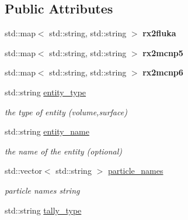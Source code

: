 \subsection*{Public Attributes}
\begin{DoxyCompactItemize}
\item 
\mbox{\label{classpyne_1_1_tally_a451b6a2d7a0de5e54936f2274861cc0d}} 
std\+::map$<$ std\+::string, std\+::string $>$ {\bfseries rx2fluka}
\item 
\mbox{\label{classpyne_1_1_tally_ae402f5aca5baea59ffc51f68e12e0d30}} 
std\+::map$<$ std\+::string, std\+::string $>$ {\bfseries rx2mcnp5}
\item 
\mbox{\label{classpyne_1_1_tally_a6c2c0bad20d29a6b73110ae5610cd572}} 
std\+::map$<$ std\+::string, std\+::string $>$ {\bfseries rx2mcnp6}
\item 
std\+::string \hyperlink{classpyne_1_1_tally_a8b2e517c759ca71bc7b25c4de5a412f9}{entity\+\_\+type}
\begin{DoxyCompactList}\small\item\em the type of entity (volume,surface) \end{DoxyCompactList}\item 
\mbox{\label{classpyne_1_1_tally_ac7892546a42be1385f0e805638a124b1}} 
std\+::string \hyperlink{classpyne_1_1_tally_ac7892546a42be1385f0e805638a124b1}{entity\+\_\+name}
\begin{DoxyCompactList}\small\item\em the name of the entity (optional) \end{DoxyCompactList}\item 
\mbox{\label{classpyne_1_1_tally_ae9f50d9930ebcf219011e2fafd2613d7}} 
std\+::vector$<$ std\+::string $>$ \hyperlink{classpyne_1_1_tally_ae9f50d9930ebcf219011e2fafd2613d7}{particle\+\_\+names}
\begin{DoxyCompactList}\small\item\em particle names string \end{DoxyCompactList}\item 
\mbox{\label{classpyne_1_1_tally_ae5944106656a49e0f7f525e75acaa4b2}} 
std\+::string \hyperlink{classpyne_1_1_tally_ae5944106656a49e0f7f525e75acaa4b2}{tally\+\_\+type}

\end{DoxyCompactItemize}
